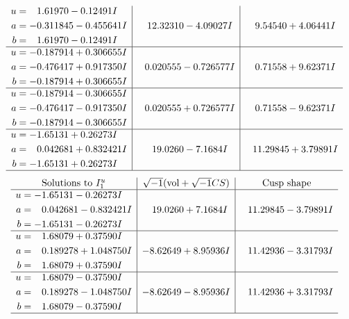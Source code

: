 \documentclass[1p]{elsarticle_modified}
\theoremstyle{definition}
\newcommand{\I}{\sqrt{-1}}
\begin{document}
$$\begin{array}{c|c|c}
\begin{aligned}
u &= \phantom{-}1.61970 - 0.12491 I \\
a &= -0.311845 - 0.455641 I \\
b &= \phantom{-}1.61970 - 0.12491 I\end{aligned}
 & \phantom{-}12.32310 - 4.09027 I & \phantom{-}9.54540 + 4.06441 I \\ \hline\begin{aligned}
u &= -0.187914 + 0.306655 I \\
a &= -0.476417 + 0.917350 I \\
b &= -0.187914 + 0.306655 I\end{aligned}
 & \phantom{-}0.020555 - 0.726577 I & \phantom{-}0.71558 + 9.62371 I \\ \hline\begin{aligned}
u &= -0.187914 - 0.306655 I \\
a &= -0.476417 - 0.917350 I \\
b &= -0.187914 - 0.306655 I\end{aligned}
 & \phantom{-}0.020555 + 0.726577 I & \phantom{-}0.71558 - 9.62371 I \\ \hline\begin{aligned}
u &= -1.65131 + 0.26273 I \\
a &= \phantom{-}0.042681 + 0.832421 I \\
b &= -1.65131 + 0.26273 I\end{aligned}
 & \phantom{-}19.0260 - 7.1684 I & \phantom{-}11.29845 + 3.79891 I\\
 \hline 
 \end{array}$$\newpage$$\begin{array}{c|c|c}  
\text{Solutions to }I^u_{1}& \I (\text{vol} + \sqrt{-1}CS) & \text{Cusp shape}\\
 \hline 
\begin{aligned}
u &= -1.65131 - 0.26273 I \\
a &= \phantom{-}0.042681 - 0.832421 I \\
b &= -1.65131 - 0.26273 I\end{aligned}
 & \phantom{-}19.0260 + 7.1684 I & \phantom{-}11.29845 - 3.79891 I \\ \hline\begin{aligned}
u &= \phantom{-}1.68079 + 0.37590 I \\
a &= \phantom{-}0.189278 + 1.048750 I \\
b &= \phantom{-}1.68079 + 0.37590 I\end{aligned}
 & -8.62649 + 8.95936 I & \phantom{-}11.42936 - 3.31793 I \\ \hline\begin{aligned}
u &= \phantom{-}1.68079 - 0.37590 I \\
a &= \phantom{-}0.189278 - 1.048750 I \\
b &= \phantom{-}1.68079 - 0.37590 I\end{aligned}
 & -8.62649 - 8.95936 I & \phantom{-}11.42936 + 3.31793 I\\
 \hline 
 \end{array}$$\newpage\newpage\renewcommand{\arraystretch}{1}
\end{document}
